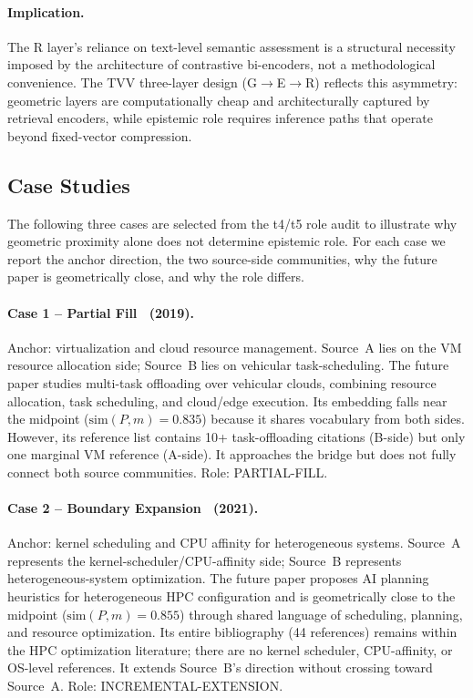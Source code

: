 \documentclass[11pt,twocolumn]{article}
\begin{document}
\paragraph{Implication.}
The R layer's reliance on text-level semantic assessment is a structural
necessity imposed by the architecture of contrastive bi-encoders, not a
methodological convenience. The TVV three-layer design (G$\to$E$\to$R)
reflects this asymmetry: geometric layers are computationally cheap and
architecturally captured by retrieval encoders, while epistemic role
requires inference paths that operate beyond fixed-vector compression.

\subsection{Case Studies}

The following three cases are selected from the t4/t5 role audit to illustrate
why geometric proximity alone does not determine epistemic role.
For each case we report the anchor direction, the two source-side communities,
why the future paper is geometrically close, and why the role differs.

\paragraph{Case 1 -- Partial Fill~\cite{case1} (2019).}
Anchor: virtualization and cloud resource management.
Source~A lies on the VM resource allocation side; Source~B lies on
vehicular task-scheduling. The future paper studies multi-task offloading
over vehicular clouds, combining resource allocation, task scheduling,
and cloud/edge execution. Its embedding falls near the midpoint
($\mathrm{sim}(P,m){=}0.835$) because it shares vocabulary from both sides.
However, its reference list contains 10+ task-offloading citations (B-side)
but only one marginal VM reference (A-side).
It approaches the bridge but does not fully connect both source communities.
Role: PARTIAL-FILL.

\paragraph{Case 2 -- Boundary Expansion~\cite{case2} (2021).}
Anchor: kernel scheduling and CPU affinity for heterogeneous systems.
Source~A represents the kernel-scheduler/CPU-affinity side; Source~B represents
heterogeneous-system optimization. The future paper proposes AI planning heuristics
for heterogeneous HPC configuration and is geometrically close to the midpoint
($\mathrm{sim}(P,m){=}0.855$) through shared language of scheduling, planning,
and resource optimization.
Its entire bibliography (44 references) remains within the HPC optimization
literature; there are no kernel scheduler, CPU-affinity, or OS-level references.
It extends Source~B's direction without crossing toward Source~A.
Role: INCREMENTAL-EXTENSION.
\end{document}
